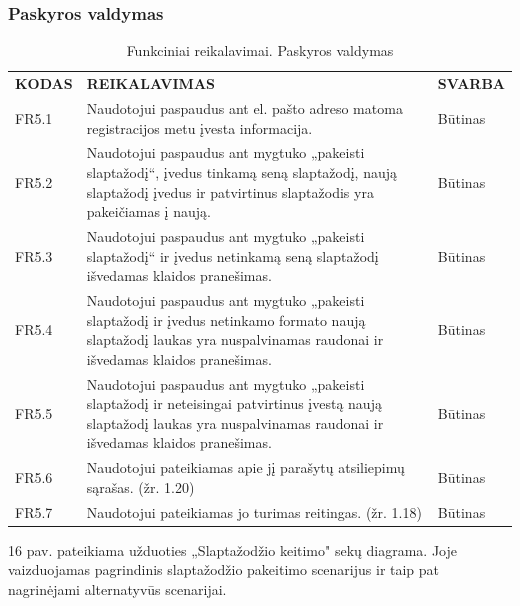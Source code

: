 \documentclass{VUMIFPSkursinis}
\begin{document}
\subsubsection{Paskyros valdymas}
\begin{table}[H]
\caption{Funkciniai reikalavimai. Paskyros valdymas}
\centering
\normalsize
\begin{tabular}{|p{2cm}|p{10cm}|p{3cm}|}
\hline
\rowcolor{gray!30}
\multicolumn{3}{|l|}{\textbf{5. Paskyros valdymas}} \\ \hline
\textbf{KODAS}& \multicolumn{1}{m{10cm}|}{\textbf{REIKALAVIMAS}} & \textbf{SVARBA} \\ \hline
FR5.1 & \multicolumn{1}{m{10cm}|}{Naudotojui paspaudus ant el. pašto adreso matoma registracijos metu įvesta informacija.} & Būtinas \\ \hline
FR5.2 & \multicolumn{1}{m{10cm}|}{Naudotojui paspaudus ant mygtuko „pakeisti slaptažodį“, įvedus tinkamą seną slaptažodį, naują slaptažodį įvedus ir patvirtinus slaptažodis yra pakeičiamas į naują.} & Būtinas \\ \hline
FR5.3 & \multicolumn{1}{m{10cm}|}{Naudotojui paspaudus ant mygtuko „pakeisti slaptažodį“ ir įvedus netinkamą seną slaptažodį išvedamas klaidos pranešimas.} & Būtinas \\ \hline
FR5.4 & \multicolumn{1}{m{10cm}|}{Naudotojui paspaudus ant mygtuko „pakeisti slaptažodį ir įvedus netinkamo formato naują slaptažodį laukas yra nuspalvinamas raudonai ir išvedamas klaidos pranešimas.} & Būtinas \\ \hline
FR5.5 & \multicolumn{1}{m{10cm}|}{Naudotojui paspaudus ant mygtuko „pakeisti slaptažodį ir neteisingai patvirtinus įvestą naują slaptažodį laukas yra nuspalvinamas raudonai ir išvedamas klaidos pranešimas.} & Būtinas \\ \hline
FR5.6 & \multicolumn{1}{m{10cm}|}{Naudotojui pateikiamas apie jį parašytų atsiliepimų sąrašas. (žr. 1.20)} & Būtinas \\ \hline
FR5.7 & \multicolumn{1}{m{10cm}|}{Naudotojui pateikiamas jo turimas reitingas. (žr. 1.18)} & Būtinas \\ \hline
\end{tabular}
\end{table}
16 pav. pateikiama užduoties „Slaptažodžio keitimo" sekų diagrama. Joje vaizduojamas pagrindinis slaptažodžio pakeitimo scenarijus ir taip pat nagrinėjami alternatyvūs scenarijai.
\end{document}
